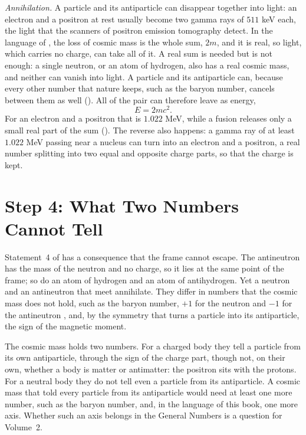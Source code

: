 \emph{Annihilation.} A particle and its antiparticle can disappear together into light: an electron and a positron at rest usually become two gamma rays of $511$ keV each, the light that the scanners of positron emission tomography detect. In the language of , the loss of cosmic mass is the whole sum, $2m$, and it is real, so light, which carries no charge, can take all of it. A real sum is needed but is not enough: a single neutron, or an atom of hydrogen, also has a real cosmic mass, and neither can vanish into light. A particle and its antiparticle can, because every other number that nature keeps, such as the baryon number, cancels between them as well (). All of the pair can therefore leave as energy,
\[
E = 2mc^2 .
\]
For an electron and a positron that is $1.022$ MeV, while a fusion releases only a small real part of the sum (). The reverse also happens: a gamma ray of at least $1.022$ MeV passing near a nucleus can turn into an electron and a positron, a real number splitting into two equal and opposite charge parts, so that the charge is kept.

\section{Step 4: What Two Numbers Cannot Tell}\label{sec:fa-neutral}

Statement~4 of  has a consequence that the frame cannot escape. The antineutron has the mass of the neutron and no charge, so it lies at the same point of the frame; so do an atom of hydrogen and an atom of antihydrogen. Yet a neutron and an antineutron that meet annihilate. They differ in numbers that the cosmic mass does not hold, such as the baryon number, $+1$ for the neutron and $-1$ for the antineutron \citep{PDG2024}, and, by the symmetry that turns a particle into its antiparticle, the sign of the magnetic moment.

\begin{remark}\label{rem:fa-two-numbers}
The cosmic mass holds two numbers. For a charged body they tell a particle from its own antiparticle, through the sign of the charge part, though not, on their own, whether a body is matter or antimatter: the positron sits with the protons. For a neutral body they do not tell even a particle from its antiparticle. A cosmic mass that told every particle from its antiparticle would need at least one more number, such as the baryon number, and, in the language of this book, one more axis. Whether such an axis belongs in the General Numbers is a question for Volume~2.
\end{remark}

